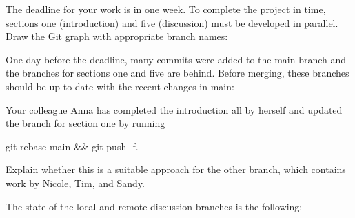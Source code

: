 \documentclass[12pt]{scrartcl}
\begin{document}
\noindent
The deadline for your work is in one week. To complete the project in time, sections one (introduction) and five (discussion) must be developed in parallel. Draw the Git graph with appropriate branch names:

\vspace{8cm}

\noindent
One day before the deadline, many commits were added to the main branch and the branches for sections one and five are behind. Before merging, these branches should be up-to-date with the recent changes in main:

\vspace{0.5cm}

\hrulefill

\vspace{0.5cm}

\hrulefill

\vspace{0.5cm}

\noindent
Your colleague Anna has completed the introduction all by herself and updated the branch for section one by running

\vspace{0.3cm}

git rebase main \&\& git push -f.

\vspace{0.3cm}

\noindent
Explain whether this is a suitable approach for the other branch, which contains work by Nicole, Tim, and Sandy.
\vspace{0.5cm}

\hrulefill

\vspace{0.5cm}

\hrulefill

\vspace{0.5cm}

\hrulefill

\vspace{0.5cm}

\noindent
The state of the local and remote discussion branches is the following:
\end{document}

